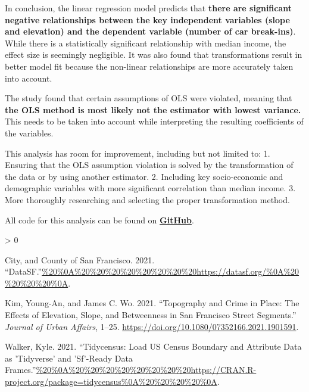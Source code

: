 \documentclass[
]{article}
\newlength{\cslhangindent}
\newenvironment{CSLReferences}[2] %
 {%
  \setlength{\parindent}{0pt}
  \ifodd #1 \everypar{\setlength{\hangindent}{\cslhangindent}}\ignorespaces\fi
  \ifnum #2 > 0
  \setlength{\parskip}{#2\baselineskip}
  \fi
 }%
 {}
\begin{document}
In conclusion, the linear regression model predicts that \textbf{there
are significant negative relationships between the key independent
variables (slope and elevation) and the dependent variable (number of
car break-ins)}. While there is a statistically significant relationship
with median income, the effect size is seemingly negligible. It was also
found that transformations result in better model fit because the
non-linear relationships are more accurately taken into account.

The study found that certain assumptions of OLS were violated, meaning
that \textbf{the OLS method is most likely not the estimator with lowest
variance.} This needs to be taken into account while interpreting the
resulting coefficients of the variables.

This analysis has room for improvement, including but not limited to: 1.
Ensuring that the OLS assumption violation is solved by the
transformation of the data or by using another estimator. 2. Including
key socio-economic and demographic variables with more significant
correlation than median income. 3. More thoroughly researching and
selecting the proper transformation method.

All code for this analysis can be found on
\href{https://github.com/alexclippinger/alexclippinger.github.io/blob/main/_posts/2021-11-02-sf-crime-and-hilliness/sf-crime-and-hilliness.Rmd}{\textbf{GitHub}}.

\hypertarget{refs}{}
\begin{CSLReferences}{1}{0}
\leavevmode\hypertarget{ref-sfdata}{}%
City, and County of San Francisco. 2021.
{``DataSF.''}\url{\%20\%0A\%20\%20\%20\%20\%20\%20\%20\%20https://datasf.org/\%0A\%20\%20\%20\%20\%0A}.

\leavevmode\hypertarget{ref-sfcrime}{}%
Kim, Young-An, and James C. Wo. 2021. {``Topography and Crime in Place:
The Effects of Elevation, Slope, and Betweenness in San Francisco Street
Segments.''} \emph{Journal of Urban Affairs}, 1--25.
\url{https://doi.org/10.1080/07352166.2021.1901591}.

\leavevmode\hypertarget{ref-tidycensus}{}%
Walker, Kyle. 2021. {``Tidycensus: Load US Census Boundary and Attribute
Data as 'Tidyverse' and 'Sf'-Ready Data
Frames.''}\url{\%20\%0A\%20\%20\%20\%20\%20\%20\%20\%20https://CRAN.R-project.org/package=tidycensus\%0A\%20\%20\%20\%20\%0A}.

\end{CSLReferences}
\end{document}

